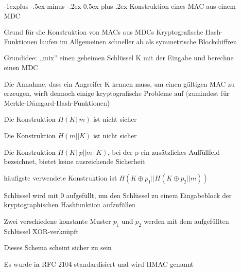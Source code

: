 \documentclass[a4paper]{article}
\makeatletter
\renewcommand{\subsection}{\@startsection{subsection}{2}{0mm}%
 {-1explus -.5ex minus -.2ex}%
 {0.5ex plus .2ex}%
 {\normalfont\normalsize\bfseries}}
\makeatother
\begin{document}
\begin{multicols}{3}
      \subsection{Konstruktion eines MAC aus einem MDC}
      \begin{itemize*}
            \item Grund für die Konstruktion von MACs aus MDCs Kryptografische Hash-Funktionen laufen im Allgemeinen schneller ab als symmetrische Blockchiffren
            \item Grundidee: ,,mix'' einen geheimen Schlüssel K mit der Eingabe und berechne einen MDC
            \item Die Annahme, dass ein Angreifer K kennen muss, um einen gültigen MAC zu erzeugen, wirft dennoch einige kryptografische Probleme auf (zumindest für Merkle-Dåmgard-Hash-Funktionen)
            \begin{itemize*}
                  \item Die Konstruktion $H(K||m)$ ist nicht sicher
                  \item Die Konstruktion $H(m||K)$ ist nicht sicher
                  \item Die Konstruktion $H(K||p||m||K)$, bei der p ein zusätzliches Auffüllfeld bezeichnet, bietet keine ausreichende Sicherheit
            \end{itemize*}
            \item häufigste verwendete Konstruktion ist $H(K\oplus p_1||H(K\oplus p_2||m))$
            \begin{itemize*}
                  \item Schlüssel wird mit $0$ aufgefüllt, um den Schlüssel zu einem Eingabeblock der kryptographischen Hashfunktion aufzufüllen
                  \item Zwei verschiedene konstante Muster $p_1$ und $p_2$ werden mit dem aufgefüllten Schlüssel XOR-verknüpft
                  \item Dieses Schema scheint sicher zu sein
                  \item Es wurde in RFC 2104 standardisiert und wird HMAC genannt
            \end{itemize*}
      \end{itemize*}


\end{multicols}
\end{document}
